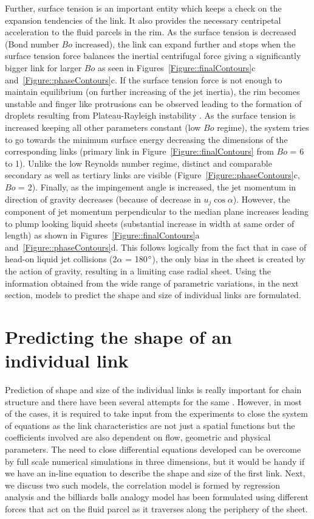 \documentclass[%
aip,
sd,%
amsmath,amssymb,
preprint,%
author-year,%
]{revtex4-1}
\begin{document}
Further, surface tension is an important entity which keeps a check on the expansion tendencies of the link. It also provides the necessary centripetal acceleration to the fluid parcels in the rim. As the surface tension is decreased (Bond number $Bo$ increased), the link can expand further and stops when the surface tension force balances the inertial centrifugal force giving a significantly bigger link for larger $Bo$ as seen in Figures~\ref{Figure::finalContours}c and~\ref{Figure::phaseContours}c. If the surface tension force is not enough to maintain equilibrium (on further increasing of the jet inertia), the rim becomes unstable and finger like protrusions can be observed leading to the formation of droplets resulting from Plateau-Rayleigh instability \citep{bremond2006atomization}. As the surface tension is increased keeping all other parameters constant (low $Bo$ regime), the system tries to go towards the minimum surface energy decreasing the dimensions of the corresponding links (primary link in Figure~\ref{Figure::finalContours} from $Bo$ = 6 to 1). Unlike the low Reynolds number regime, distinct and comparable secondary as well as tertiary links are visible (Figure~\ref{Figure::phaseContours}c, $Bo$ = 2). Finally, as the impingement angle is increased, the jet momentum in direction of gravity decreases (because of decrease in $u_j\cos\alpha$). However, the component of jet momentum perpendicular to the median plane increases leading to plump looking liquid sheets (substantial increase in width at same order of length) as shown in Figures~\ref{Figure::finalContours}a and~\ref{Figure::phaseContours}d. This follows logically from the fact that in case of head-on liquid jet collisions ($2\alpha$ = 180$\degree$), the only bias in the sheet is created by the action of gravity, resulting in a limiting case radial sheet. Using the information obtained from the wide range of parametric variations, in the next section, models to predict the shape and size of individual links are formulated.      
\section{Predicting the shape of an individual link}
\label{Section::Models}
Prediction of shape and size of the individual links is really important for chain structure and there have been several attempts for the same \cite{bush2004collision,bremond2006atomization}. However, in most of the cases, it is required to take input from the experiments to close the system of equations as the link characteristics are not just a spatial functions but the coefficients involved are also dependent on flow, geometric and physical parameters. The need to close differential equations developed can be overcome by full scale numerical simulations in three dimensions, but it would be handy if we have an in-line equation to describe the shape and size of the first link. Next, we discuss two such models, the correlation model is formed by regression analysis and the billiards balls analogy model has been formulated using different forces that act on the fluid parcel as it traverses along the periphery of the sheet.
\end{document}
